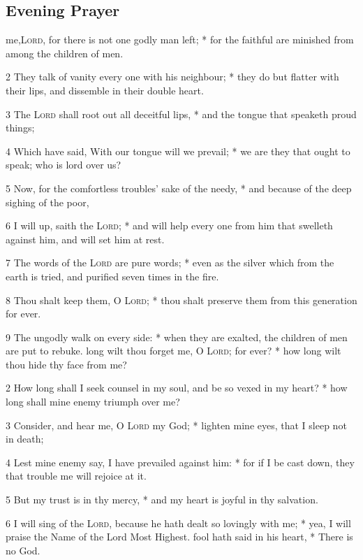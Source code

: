 \subsection{Evening Prayer}
 me,{\textsc{Lord}}, for there is not one godly man left; * for the faithful are minished from among the children of men.\par
2 They talk of vanity every one with his neighbour; * they do but flatter with their lips, and dissemble in their double heart.\par
3 The {\textsc{Lord}} shall root out all deceitful lips, * and the tongue that speaketh proud things;\par
4 Which have said, With our tongue will we prevail; * we are they that ought to speak; who is lord over us?\par
5 Now, for the comfortless troubles' sake of the needy, * and because of the deep sighing of the poor,\par
6 I will up, saith the {\textsc{Lord}}; * and will help every one from him that swelleth against him, and will set him at rest.\par
7 The words of the {\textsc{Lord}} are pure words; * even as the silver which from the earth is tried, and purified seven times in the fire.\par
8 Thou shalt keep them, O {\textsc{Lord}}; * thou shalt preserve them from this generation for ever.\par
9 The ungodly walk on every side: * when they are exalted, the children of men are put to rebuke.
 long wilt thou forget me, O {\textsc{Lord}}; for ever? * how long wilt thou hide thy face from me?\par
2 How long shall I seek counsel in my soul, and be so vexed in my heart? * how long shall mine enemy triumph over me?\par
3 Consider, and hear me, O {\textsc{Lord}} my God; * lighten mine eyes, that I sleep not in death;\par
4 Lest mine enemy say, I have prevailed against him: * for if I be cast down, they that trouble me will rejoice at it.\par
5 But my trust is in thy mercy, * and my heart is joyful in thy salvation.\par
6 I will sing of the {\textsc{Lord}}, because he hath dealt so lovingly with me; * yea, I will praise the Name of the Lord Most Highest.
 fool hath said in his heart, * There is no God.\par
